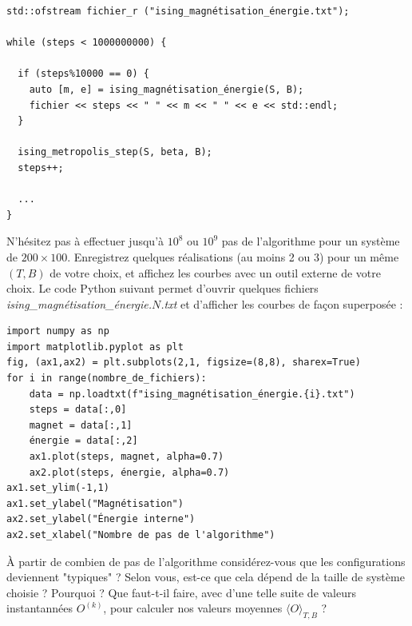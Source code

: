 \documentclass{book}
\def\filename{\emph}
\begin{document}
\begin{verbatim}
std::ofstream fichier_r ("ising_magnétisation_énergie.txt");

while (steps < 1000000000) {

  if (steps%10000 == 0) {
    auto [m, e] = ising_magnétisation_énergie(S, B);
    fichier << steps << " " << m << " " << e << std::endl;
  }

  ising_metropolis_step(S, beta, B);
  steps++;

  ...
}
\end{verbatim}

N'hésitez pas à effectuer jusqu'à $10^8$ ou $10^9$ pas de l'algorithme pour un système de $200 \times 100$. Enregistrez quelques réalisations (au moins 2 ou 3) pour un même $(T,B)$ de votre choix, et affichez les courbes avec un outil externe de votre choix. Le code Python suivant permet d'ouvrir quelques fichiers \filename{ising\_magnétisation\_énergie.$N$.txt} et d'afficher les courbes de façon superposée :
\begin{verbatim}
import numpy as np
import matplotlib.pyplot as plt
fig, (ax1,ax2) = plt.subplots(2,1, figsize=(8,8), sharex=True)
for i in range(nombre_de_fichiers):
    data = np.loadtxt(f"ising_magnétisation_énergie.{i}.txt")
    steps = data[:,0]
    magnet = data[:,1]
    énergie = data[:,2]
    ax1.plot(steps, magnet, alpha=0.7)
    ax2.plot(steps, énergie, alpha=0.7)
ax1.set_ylim(-1,1)
ax1.set_ylabel("Magnétisation")
ax2.set_ylabel("Énergie interne")
ax2.set_xlabel("Nombre de pas de l'algorithme")
\end{verbatim}

À partir de combien de pas de l'algorithme considérez-vous que les configurations deviennent "typiques" ? Selon vous, est-ce que cela dépend de la taille de système choisie ? Pourquoi ? Que faut-t-il faire, avec d'une telle suite de valeurs instantannées $O^{(k)}$, pour calculer nos valeurs moyennes $\langle O \rangle_{T,B}$ ?
\end{document}

